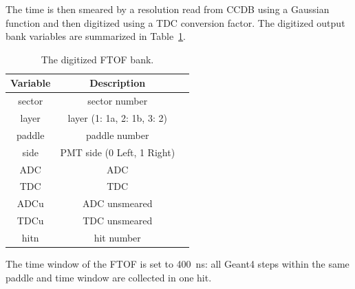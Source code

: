 The time is then smeared by a resolution read from CCDB using a Gaussian function and then digitized using a TDC
conversion factor. The digitized output bank variables are summarized in Table~\ref{tab:ftofBank}.

\begin{table}[h]
	\begin{center}
		\begin{tabular}{| c | c | c |}
			\hline \hline
			Variable  & Description                                 \\
			\hline
              sector  &                             sector number   \\
               layer  &               layer (1: 1a, 2: 1b, 3: 2)   \\
              paddle  &                             paddle number   \\
                side  &                PMT side (0 Left, 1 Right)   \\
                 ADC  &                                       ADC   \\
                 TDC  &                                       TDC   \\
                ADCu  &                             ADC unsmeared   \\
                TDCu  &                             TDC unsmeared   \\
                hitn  &                                hit number   \\
			\hline \hline
		\end{tabular}
	\end{center}
	\caption{The digitized FTOF bank.}\label{tab:ftofBank}
\end{table}


The time window  of the FTOF is set to 400~ns: all Geant4 steps within the same paddle and time window are collected
in one hit.


